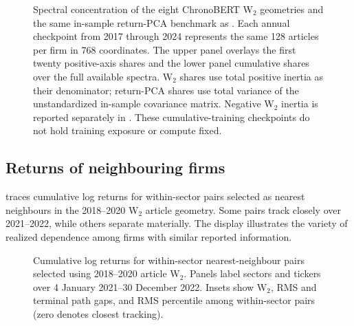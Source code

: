 \begin{figure}[H]
  \centering
  \caption{Spectral concentration of the eight ChronoBERT W$_2$ geometries
    and the same in-sample return-PCA benchmark as .
    Each annual checkpoint from 2017 through 2024 represents the same 128
    articles per firm in 768 coordinates.
    The upper panel overlays the first twenty positive-axis shares and the
    lower panel cumulative shares over the full available spectra.
    W$_2$ shares use total positive inertia as their denominator; return-PCA
    shares use total variance of the unstandardized in-sample covariance
    matrix. Negative W$_2$ inertia is reported separately in
    .
    These cumulative-training checkpoints do not hold training exposure or
  compute fixed. }
  \label{fig:pcoa-vintage-scree}
\end{figure}



\subsection{Returns of neighbouring firms}
\label{sec:exploratory-geometry-outcomes}

 traces cumulative log returns for
 within-sector pairs selected as
nearest neighbours in the 2018--2020 W$_2$ article geometry.
Some pairs track closely over 2021--2022, while others separate materially.
The display illustrates the variety of realized dependence among firms with
similar reported information.

\begin{figure}[H]
  \centering
  \caption{Cumulative log returns for
     within-sector nearest-neighbour
    pairs selected using 2018--2020 article W$_2$.
    Panels label sectors and tickers over 4 January 2021--30 December 2022.
    Insets show W$_2$, RMS and terminal path gaps, and RMS percentile among
    within-sector pairs (zero denotes closest tracking).
  }
  \label{fig:neighbour-outcome-paths}
\end{figure}

